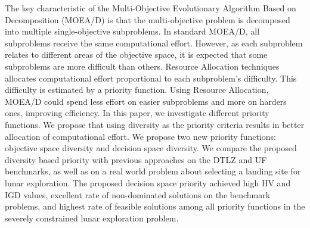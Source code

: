 The key characteristic of the Multi-Objective Evolutionary Algorithm Based on
Decomposition (MOEA/D) is that the multi-objective problem is decomposed into
multiple single-objective subproblems.
%
In standard MOEA/D, all subproblems receive the same computational effort.
However, as each subproblem relates to different areas of the objective space,
it is expected that some subproblems are more difficult than others.
%
Resource Allocation techniques allocates computational effort proportional to
each subproblem's difficulty. This difficulty is estimated by a priority
function. Using Resource Allocation, MOEA/D could spend less effort on easier
subproblems and more on harders ones, improving efficiency.
%
In this paper, we investigate different priority functions. We propose that
using diversity as the priority criteria results in better allocation of
computational effort.
%
We propose two new priority functions: objective space diversity and decision
space diversity.
%
We compare the proposed diversity based priority with previous approaches on the
DTLZ and UF benchmarks, as well as on a real world problem about selecting a
landing site for lunar exploration.
%
The proposed decision space priority achieved high HV and IGD values,
excellent rate of non-dominated solutions on the benchmark problems,
and highest rate of feasible solutions among all priority functions in
the severely constrained lunar exploration problem.
